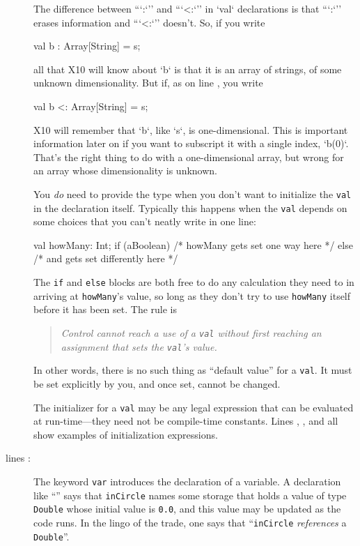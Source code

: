 \begin{description}
\begin{nonquote}
The difference between ``\xcd`:`'' and ``\xcd`<:`'' in \xcd`val` declarations
is that  ``\xcd`:`'' erases information and ``\xcd`<:`'' doesn't.  
So, if you write 
\begin{xten}
val b : Array[String] = s;
\end{xten}
\noindent
all that X10 will know about \xcd`b` is that it is an array of strings, of
some unknown dimensionality.  But if, as on line , you
write 
\begin{xten}
val b <: Array[String] = s;
\end{xten}
\noindent
X10 will remember that \xcd`b`, like \xcd`s`, is one-dimensional. This is
important information later on if you want to subscript it with a single
index, \xcd`b(0)`.  That's the right thing to do with a one-dimensional array,
but wrong for an array whose dimensionality is unknown.


You {\em do} need to provide the type when you don't want to initialize
the {\tt val} in the declaration itself.  Typically this happens when the {\tt val}
depends on some choices that you can't neatly write in one line:
\begin{xten}
     val howMany: Int;
     if (aBoolean) {/* howMany gets set one way here */}
     else {/* and gets set differently here */}    
\end{xten}
The {\tt if} and {\tt else} blocks are both free to do any calculation they
need to in arriving at {\tt howMany}'s value, so long as they don't try to
use {\tt howMany} itself before it has been set.  
The rule is
\begin{quote}
{\em Control cannot reach a use of a {\tt val} without first
reaching an assignment that sets the {\tt val}'s value.}
\end{quote}
In other words, there is no such thing as ``default value'' for a {\tt val}.
It must be set explicitly by you, and once set, cannot be changed.
\end{nonquote}

The initializer for a {\tt val} may be any legal \Xten{} expression that can be
evaluated at run-time---they need not be compile-time constants.  Lines  ,
 , and   all show examples of initialization expressions.

\item[lines  \xlref{mpi1-incircle}{6}:]  
The keyword {\tt var} introduces the declaration of a variable.
A declaration like ``''  says that
{\tt inCircle} names some storage that holds a value of type {\tt Double}
whose initial value is {\tt 0.0}, and this value
may be updated as the code runs.  In the lingo of the trade, one
says that ``{\tt inCircle} {\em references} a {\tt Double}''.  


\end{description}
